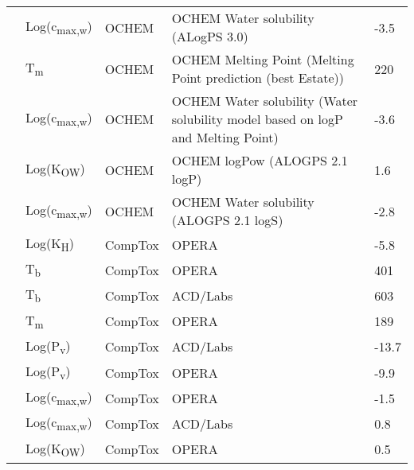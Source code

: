 \begin{landscape}
\begin{longtable}[c]{lllll}
          & Log(c\textsubscript{max,w}) & OCHEM      & OCHEM Water solubility (ALogPS 3.0)                                             & -3.5  \\
          & T\textsubscript{m}          & OCHEM      & OCHEM Melting Point (Melting Point prediction (best Estate))                    & 220   \\
          & Log(c\textsubscript{max,w}) & OCHEM      & OCHEM Water solubility (Water solubility model based on logP and Melting Point) & -3.6  \\
          & Log(K\textsubscript{OW})      & OCHEM      & OCHEM logPow (ALOGPS 2.1 logP)                                                  & 1.6   \\
          & Log(c\textsubscript{max,w}) & OCHEM      & OCHEM Water solubility (ALOGPS 2.1 logS)                                        & -2.8  \\
          & Log(K\textsubscript{H})       & CompTox    & OPERA                                                                           & -5.8  \\
          & T\textsubscript{b}          & CompTox    & OPERA                                                                           & 401   \\
          & T\textsubscript{b}          & CompTox    & ACD/Labs                                                                        & 603   \\
          & T\textsubscript{m}          & CompTox    & OPERA                                                                           & 189   \\
          & Log(P\textsubscript{v})       & CompTox    & ACD/Labs                                                                        & -13.7 \\
          & Log(P\textsubscript{v})       & CompTox    & OPERA                                                                           & -9.9  \\
          & Log(c\textsubscript{max,w}) & CompTox    & OPERA                                                                           & -1.5  \\
          & Log(c\textsubscript{max,w}) & CompTox    & ACD/Labs                                                                        & 0.8   \\
          & Log(K\textsubscript{OW})      & CompTox    & OPERA                                                                           & 0.5   \\

\end{longtable}
\end{landscape}
